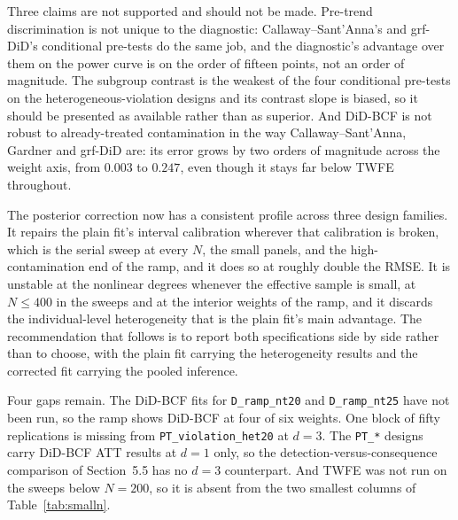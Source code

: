 \documentclass[11pt]{article}
\begin{document}
Three claims are not supported and should not be made. Pre-trend
discrimination is not unique to the diagnostic: Callaway--Sant'Anna's and
grf-DiD's conditional pre-tests do the same job, and the diagnostic's
advantage over them on the power curve is on the order of fifteen points, not
an order of magnitude. The subgroup contrast is the weakest of the four
conditional pre-tests on the heterogeneous-violation designs and its contrast
slope is biased, so it should be presented as available rather than as
superior. And DiD-BCF is not robust to already-treated contamination in the
way Callaway--Sant'Anna, Gardner and grf-DiD are: its error grows by two
orders of magnitude across the weight axis, from $0.003$ to $0.247$, even
though it stays far below TWFE throughout.

The posterior correction now has a consistent profile across three design
families. It repairs the plain fit's interval calibration wherever that
calibration is broken, which is the serial sweep at every $N$, the small
panels, and the high-contamination end of the ramp, and it does so at roughly
double the RMSE. It is unstable at the nonlinear degrees whenever the
effective sample is small, at $N\leq400$ in the sweeps and at the interior
weights of the ramp, and it discards the individual-level heterogeneity that
is the plain fit's main advantage. The recommendation that follows is to
report both specifications side by side rather than to choose, with the plain
fit carrying the heterogeneity results and the corrected fit carrying the
pooled inference.

Four gaps remain. The DiD-BCF fits for \texttt{D\_ramp\_nt20} and
\texttt{D\_ramp\_nt25} have not been run, so the ramp shows DiD-BCF at four of
six weights. One block of fifty replications is missing from
\texttt{PT\_violation\_het20} at $d=3$. The \texttt{PT\_*} designs carry
DiD-BCF ATT results at $d=1$ only, so the detection-versus-consequence
comparison of Section~5.5 has no $d=3$ counterpart. And TWFE was not run on the sweeps
below $N=200$, so it is absent from the two smallest columns of
Table~\ref{tab:smalln}.
\end{document}

